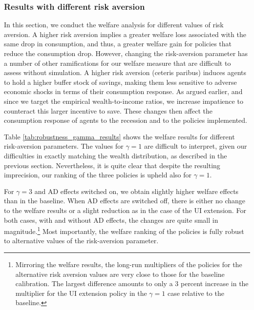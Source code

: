 \documentclass[\econtexRoot/EGMN]{subfiles}
\begin{document}
\subsubsection{Results with different risk aversion}
\notinsubfile{\label{sec:robust_gamma_results}}

In this section, we conduct the welfare analysis for different values of risk aversion. A higher risk aversion implies a greater welfare loss associated with the same drop in consumption, and thus, a greater welfare gain for policies that reduce the consumption drop. However, changing the risk-aversion parameter has a number of other ramifications for our welfare measure that are difficult to assess without simulation. A higher risk aversion (ceteris paribus) induces agents to hold a higher buffer stock of savings, making them less sensitive to adverse economic shocks in terms of their consumption response. As argued earlier, and since we target the empirical wealth-to-income ratios, we increase impatience to counteract this larger incentive to save. These changes then affect the consumption response of agents to the recession and to the policies implemented.

Table \ref{tab:robustness_gamma_results} shows the welfare results for different risk-aversion parameters. The values for $\gamma = 1$ are difficult to interpret, given our difficulties in exactly matching the wealth distribution, as described in the previous section. Nevertheless, it is quite clear that despite the resulting imprecision, our ranking of the three policies is upheld also for $\gamma=1$.

For $\gamma=3$ and AD effects switched on, we obtain slightly higher welfare effects than in the baseline. When AD effects are switched off, there is either no change to the welfare results or a slight reduction as in the case of the UI extension. For both cases, with and without AD effects, the changes are quite small in magnitude.\footnote{Mirroring the welfare results, the long-run multipliers of the policies for the alternative risk aversion values are very close to those for the baseline calibration. The largest difference amounts to only a 3 percent increase in the multiplier for the UI extension policy in the $\gamma = 1$ case relative to the baseline.} Most importantly, the welfare ranking of the policies is fully robust to alternative values of the risk-aversion parameter.
\end{document}
